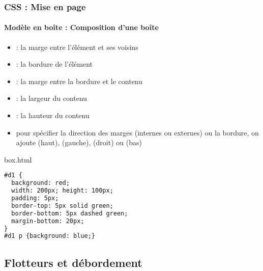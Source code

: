 \documentclass[xcolor=table]{beamer}
\begin{document}
\begin{frame}[fragile]
\frametitle{CSS : Mise en page}
\framesubtitle{Modèle en boîte : Composition d'une boîte}

\begin{minipage}{0.60\textwidth}
	\begin{itemize}
		\item {} : la marge entre l'élément et ses voisins
		\item {} : la bordure de l'élément 
		\item {} : la marge entre la bordure et le contenu
		\item {} : la largeur du contenu
		\item {} : la hauteur du contenu
		\item pour spécifier la direction des marges (internes ou externes) ou la bordure, on ajoute  (haut),  (gauche),  (droit) ou  (bas)
	\end{itemize}
\end{minipage}
%
\begin{minipage}{0.38\textwidth}
	\begin{exampleblock}{box.html}
		\lstset{escapeinside=**}
		\tiny\bfseries
\begin{lstlisting}[language={html}]
#d1 {
  background: red;
  width: 200px; height: 100px;
  padding: 5px;
  border-top: 5px solid green;
  border-bottom: 5px dashed green;
  margin-bottom: 20px;
}
#d1 p {background: blue;}
\end{lstlisting}
	\end{exampleblock}
\end{minipage}
\end{frame}

\subsection{Flotteurs et débordement}
\end{document}
